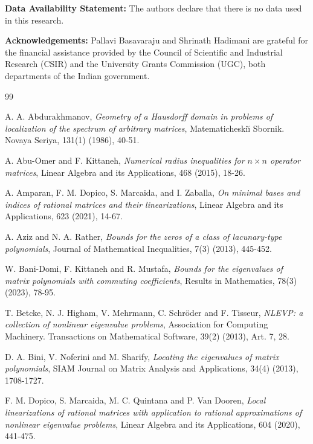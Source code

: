 \documentclass[12pt, reqno]{amsart}
\theoremstyle{definition}
\theoremstyle{remark}
\numberwithin{equation}{section}
\begin{document}
\noindent
{\bf Data Availability Statement:} The authors declare that there is no data used 
in this research.

\noindent
{\bf Acknowledgements:} Pallavi Basavaraju and Shrinath Hadimani are grateful for
the financial assistance provided by the Council of Scientific and Industrial 
Research (CSIR) and the University Grants Commission (UGC), both departments of the 
Indian government.


\begin{thebibliography}{99}

A. A. Abdurakhmanov, \emph{Geometry of a {H}ausdorff domain in problems of localization 
of the spectrum of arbitrary matrices}, Matematicheski\u{\i} Sbornik. Novaya Seriya, 
131(1) (1986), 40-51.

A. Abu-Omer and F. Kittaneh, \emph{Numerical radius inequalities for {$n\times n$} 
operator matrices}, Linear Algebra and its Applications, 468 (2015), 18-26.

A. Amparan, F. M. Dopico, S. Marcaida, and I. Zaballa, \emph{On minimal bases and indices 
of rational matrices and their linearizations}, Linear Algebra and its Applications, 
623 (2021), 14-67.

A. Aziz and N. A. Rather, \emph{Bounds for the zeros of a class of lacunary-type polynomials}, 
Journal of Mathematical Inequalities, 7(3) (2013), 445-452.

W. Bani-Domi, F. Kittaneh and R. Mustafa, \emph{Bounds for the eigenvalues of 
matrix polynomials with commuting coefficients},  Results in Mathematics, 
78(3) (2023), 78-95.

T. Betcke, N. J. Higham, V. Mehrmann, C. Schr\"{o}der and F. Tisseur, \emph{N{LEVP}: a 
collection of nonlinear eigenvalue problems}, Association for Computing Machinery. 
Transactions on Mathematical Software, 39(2) (2013), Art. 7, 28.

D. A. Bini, V. Noferini and M. Sharify, \emph{Locating the eigenvalues of matrix polynomials}, 
SIAM Journal on Matrix Analysis and Applications, 34(4) (2013), 1708-1727.

F. M. Dopico, S. Marcaida, M. C. Quintana and P. Van Dooren, \emph{Local linearizations 
of rational matrices with application to rational approximations of nonlinear eigenvalue 
problems}, Linear Algebra and its Applications, 604 (2020), 441-475.


\end{thebibliography}
\end{document}
